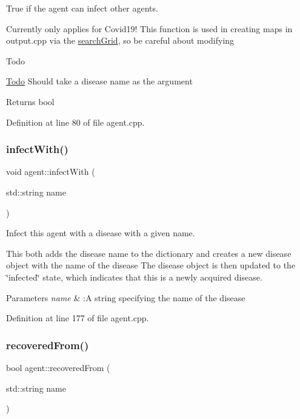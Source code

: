 True if the agent can infect other agents. 

Currently only applies for Covid19! This function is used in creating maps in output.\+cpp via the \mbox{\hyperlink{classsearchGrid}{search\+Grid}}, so be careful about modifying \begin{DoxyRefDesc}{Todo}
\item[\mbox{\hyperlink{todo__todo000002}{Todo}}]Should take a disease name as the argument\end{DoxyRefDesc}


\begin{DoxyReturn}{Returns}
bool 
\end{DoxyReturn}


Definition at line 80 of file agent.\+cpp.

\mbox{\label{classagent_ac55fabf889e49a48c055c9c495062d5e}} 
\subsubsection{\texorpdfstring{infect\+With()}{infectWith()}}
{\footnotesize\ttfamily void agent\+::infect\+With (\begin{DoxyParamCaption}\item[{std\+::string}]{name }\end{DoxyParamCaption})}



Infect this agent with a disease with a given name. 

This both adds the disease name to the dictionary and creates a new disease object with the name of the disease The disease object is then updated to the \char`\"{}infected\char`\"{} state, which indicates that this is a newly acquired disease.


\begin{DoxyParams}{Parameters}
{\em name} & \+:A string specifying the name of the disease \\
\hline
\end{DoxyParams}


Definition at line 177 of file agent.\+cpp.

\mbox{\label{classagent_a0eee49d52e6c47d7b425bc72cf5caf67}} 
\subsubsection{\texorpdfstring{recovered\+From()}{recoveredFrom()}}
{\footnotesize\ttfamily bool agent\+::recovered\+From (\begin{DoxyParamCaption}\item[{std\+::string}]{name }\end{DoxyParamCaption})}



